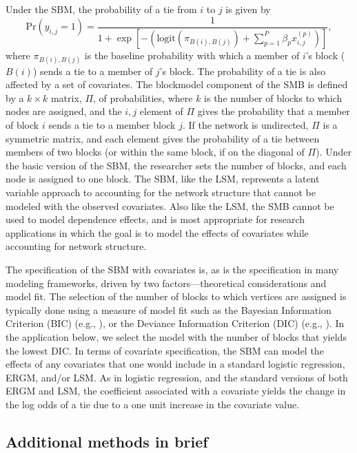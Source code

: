 \documentclass[fleqn,12pt]{wlscirep}
\begin{document}
Under the SBM, the probability of a tie from $i$ to $j$ is given by $$\text{Pr}(y_{i,j} = 1) = \frac{1}{1+\exp \left[ -\left(  \text{logit}\left( \pi_{B(i),B(j)}\right) +  \sum_{p = 1}^P \beta_p x_{i,j}^{(p)}   \right)\right]}, $$ where $\pi_{B(i),B(j)}$ is the baseline probability with which a member of $i$'s block ($B(i)$) sends a tie to a member of $j$'s block. The probability of a tie is also affected by a set of covariates. The blockmodel component of the SMB is defined by a $k \times k$ matrix, $\Pi$, of probabilities, where $k$ is the number of blocks to which nodes are assigned, and the $i,j$ element of $\Pi$ gives the probability that a member of block $i$ sends a tie to a member block $j$. If the network is undirected, $\Pi$ is a symmetric matrix, and each element gives the probability of a tie between members of two blocks (or within the same block, if on the diagonal of $\Pi$). Under the basic version of the SBM, the researcher sets the number of blocks, and each node is assigned to one block. The SBM, like the LSM, represents a latent variable approach to accounting for the network structure that cannot be modeled with the observed covariates. Also like the LSM, the SMB cannot be used to model dependence effects, and is most appropriate for research applications in which the goal is to model the effects of covariates while accounting for network structure.

The specification of the SBM with covariates is, as is the specification in many modeling frameworks, driven by two factors---theoretical considerations and model fit. The selection of the number of blocks to which vertices are assigned is typically done using a measure of model fit such as the Bayesian Information Criterion (BIC) (e.g., \citet{robinson2015dynamic}), or the Deviance Information Criterion (DIC) (e.g., \citep{sohn2017bayesian}). In the application below, we select the model with the number of blocks that yields the lowest DIC. In terms of covariate specification, the SBM can model the effects of any covariates that one would include in a standard logistic regression, ERGM, and/or LSM. As in logistic regression, and the standard versions of both ERGM and LSM, the coefficient associated with a covariate yields the change in the log odds of a tie due to a one unit increase in the covariate value.

\subsection{Additional methods in brief}
\end{document}
